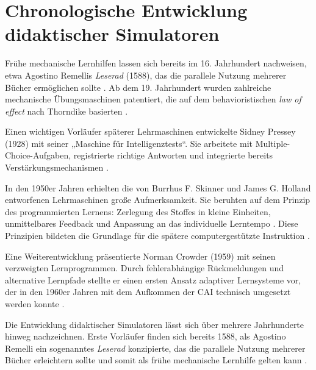 \section{Chronologische Entwicklung didaktischer Simulatoren}\label{chap:3-2-development-sim}

Frühe mechanische Lernhilfen lassen sich bereits im 16. Jahrhundert nachweisen, etwa Agostino Remellis \textit{Leserad} (1588), das die parallele Nutzung mehrerer Bücher ermöglichen sollte \parencite{cayetano_geschichte_2022}. Ab dem 19. Jahrhundert wurden zahlreiche mechanische Übungsmaschinen patentiert, die auf dem behavioristischen \textit{law of effect} nach Thorndike basierten \parencite[S.~3]{niegemann_kompendium_2008}. 

Einen wichtigen Vorläufer späterer Lehrmaschinen entwickelte Sidney Pressey (1928) mit seiner „Maschine für Intelligenztests“. Sie arbeitete mit Multiple-Choice-Aufgaben, registrierte richtige Antworten und integrierte bereits Verstärkungsmechanismen \parencites[S.~705]{benjamin_history_1988}[S.~969f]{skinner_teaching_1958}. 

In den 1950er Jahren erhielten die von Burrhus F. Skinner und James G. Holland entworfenen Lehrmaschinen große Aufmerksamkeit. Sie beruhten auf dem Prinzip des programmierten Lernens: Zerlegung des Stoffes in kleine Einheiten, unmittelbares Feedback und Anpassung an das individuelle Lerntempo \parencite[S.~970ff]{skinner_teaching_1958}. Diese Prinzipien bildeten die Grundlage für die spätere computergestützte Instruktion \parencite[S.~1971]{bruillard_teaching_2020}. 

Eine Weiterentwicklung präsentierte Norman Crowder (1959) mit seinen verzweigten Lernprogrammen. Durch fehlerabhängige Rückmeldungen und alternative Lernpfade stellte er einen ersten Ansatz adaptiver Lernsysteme vor, der in den 1960er Jahren mit dem Aufkommen der \ac{CAI} technisch umgesetzt werden konnte \parencites[S.~252ff]{crowder_differences_1963}[S.~9]{schonfeld_computerbasiertes_2006}.

\iffalse
Die Entwicklung didaktischer Simulatoren lässt sich über mehrere Jahrhunderte hinweg nachzeichnen. Erste Vorläufer finden sich bereits 1588, als Agostino Remelli ein sogenanntes \textit{Leserad} konzipierte, das die parallele Nutzung mehrerer Bücher erleichtern sollte und somit als frühe mechanische Lernhilfe gelten kann \parencite{cayetano_geschichte_2022}.

